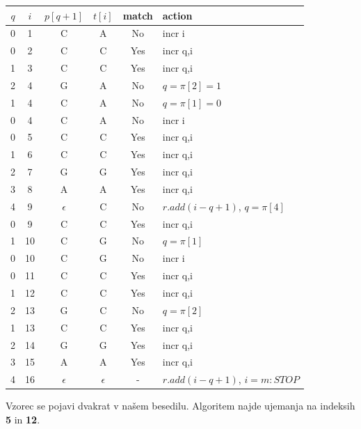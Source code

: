 \documentclass{article}
\begin{document}
\begin{enumerate}
\begin{enumerate}
				\begin{center}
					\begin{tabular}{|c|c|c|c|c|l|}
						\hline
						$q$ & $i$ & $p[q+1]$ & $t[i]$ & match & action \\
						\hline\hline
						0 & 1 & C & A & No & incr i \\
						\hline
						0 & 2 & C & C & Yes & incr q,i \\
						\hline
						1 & 3 & C & C & Yes & incr q,i \\
						\hline
						2 & 4 & G & A & No & $q=\pi[2]=1$ \\
						\hline
						1 & 4 & C & A & No & $q=\pi[1]=0$ \\
						\hline
						0 & 4 & C & A & No & incr i \\
						\hline
						0 & 5 & C & C & Yes & incr q,i \\
						\hline
						1 & 6 & C & C & Yes & incr q,i \\
						\hline
						2 & 7 & G & G & Yes & incr q,i \\
						\hline
						3 & 8 & A & A & Yes & incr q,i \\
						\hline
						4 & 9 & $\epsilon$ & C & No & $r.add(i-q+1)$, $q=\pi[4]$ \\
						\hline
						0 & 9 & C & C & Yes & incr q,i \\
						\hline
						1 & 10 & C & G & No & $q=\pi[1]$ \\
						\hline
						0 & 10 & C & G & No & incr i \\
						\hline
						0 & 11 & C & C & Yes & incr q,i \\
						\hline
						1 & 12 & C & C & Yes & incr q,i \\
						\hline
						2 & 13 & G & C & No & $q=\pi[2]$ \\
						\hline
						1 & 13 & C & C & Yes & incr q,i \\
						\hline
						2 & 14 & G & G & Yes & incr q,i \\
						\hline
						3 & 15 & A & A & Yes & incr q,i \\
						\hline
						4 & 16 & $\epsilon$ & $\epsilon$ & - & $r.add(i-q+1)$, $i=m:STOP$ \\
						\hline
					\end{tabular}
				\end{center}

				Vzorec se pojavi dvakrat v našem besedilu. Algoritem najde ujemanja na indeksih
				\textbf{5} in \textbf{12}.

				\newpage


\end{enumerate}
\end{enumerate}
\end{document}
